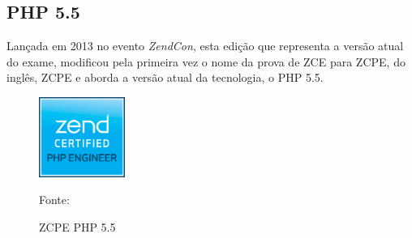 \FloatBarrier 	%
				

\subsection{PHP 5.5}

Lançada em 2013 no evento \textit{ZendCon}, esta edição que representa a versão
atual do exame, modificou pela primeira vez o nome da prova de \acs{ZCE} para
\acs{ZCPE}, do inglês, \acl{ZCPE} e aborda a versão atual da tecnologia, o
PHP 5.5.

\begin{figure}[h!tb]
	\caption{ZCPE PHP 5.5}
	\label{fig:logoCertificationPHP55}

	\centering
	\includegraphics[width=0.25\textwidth]{images/logo/php5-5.png}

	\centering
	\footnotesize Fonte: 
\end{figure}

\FloatBarrier 	%
			
